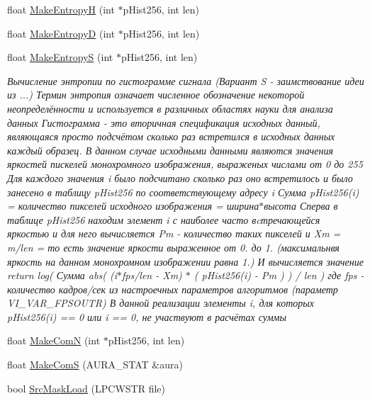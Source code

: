 \begin{DoxyCompactItemize}
float \hyperlink{class_c_v_i_engine_base_a4893abd93ae9de7f3913f24c872b23f8}{Make\+Entropy\+H} (int $\ast$p\+Hist256, int len)
\item 
float \hyperlink{class_c_v_i_engine_base_a4a6d774f1ebf9e8bf595c3e3e60f06a7}{Make\+Entropy\+D} (int $\ast$p\+Hist256, int len)
\item 
float \hyperlink{class_c_v_i_engine_base_aa13baee159190df5a7fb94bb58f55065}{Make\+Entropy\+S} (int $\ast$p\+Hist256, int len)
\begin{DoxyCompactList}\small\item\em Вычисление энтропии по гистограмме сигнала (Вариант S -\/ заимствование идеи из ...) Термин энтропия означает численное обозначение некоторой неопределённости и используется в различных областях науки для анализа данных Гистограмма -\/ это вторичная спецификация исходных данный, являющаяся просто подсчётом сколько раз встретился в исходных данных каждый образец. В данном случае исходными данными являются значения яркостей пискелей монохромного изображения, выраженых числами от 0 до 255 Для каждого значения i было подсчитано сколько раз оно встретилось и было занесено в таблицу p\+Hist256 по соответствующему адресу i Сумма p\+Hist256(i) = количество пикселей исходного изображения = ширина$\ast$высота Сперва в таблице p\+Hist256 находим элемент i с наиболее часто вcтречающейся яркостью и для него вычисляется Pm -\/ количество таких пикселей и Xm = m/len = то есть значение яркости выраженное от 0. до 1. (максимальнвя яркость на данном монохромном изображении равна 1.) И вычисляется значение return log( Сумма abs( (i$\ast$fps/len -\/ Xm) $\ast$ ( p\+Hist256(i) -\/ Pm ) ) / len ) где fps -\/ количество кадров/сек из настроечных параметров алгоритмов (параметр V\+I\+\_\+\+V\+A\+R\+\_\+\+F\+P\+S\+O\+U\+T\+R) В данной реализации элементы i, для которых p\+Hist256(i) == 0 или i == 0, не участвуют в расчётах суммы \end{DoxyCompactList}\item 
float \hyperlink{class_c_v_i_engine_base_a4bde6b4202b8dfa683becb522949e09c}{Make\+Com\+N} (int $\ast$p\+Hist256, int len)
\item 
float \hyperlink{class_c_v_i_engine_base_a6eaa6b468b27249a359a67ce1ce32c4f}{Make\+Com\+S} (A\+U\+R\+A\+\_\+\+S\+T\+A\+T \&aura)
\item 
bool \hyperlink{class_c_v_i_engine_base_a2575b5618d3f87d4b10bb1f7294a3bad}{Src\+Mask\+Load} (L\+P\+C\+W\+S\+T\+R file)

\end{DoxyCompactItemize}
